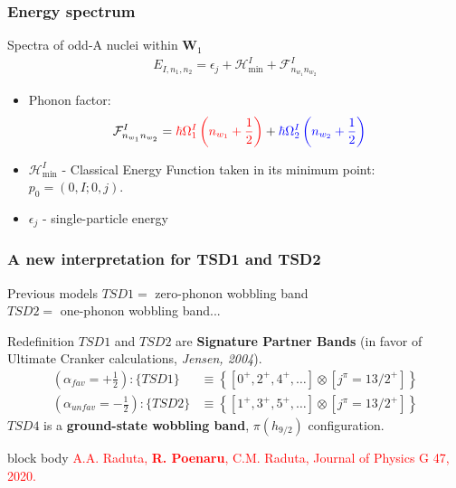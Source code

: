 \documentclass{beamer}
\begin{document}
\begin{frame}
	\frametitle{Energy spectrum}
	\begin{exampleblock}{Spectra of odd-A nuclei within $\mathbf{W}_1$}
		\begin{align}
			E_{I,n_1,n_2}=\epsilon_j+\mathcal{H}_\text{min}^I+\mathcal{F}_{n_{w_1}n_{w_2}}^I\nonumber
			\label{tsd-bands-general-spectrum}
		\end{align}
	\end{exampleblock}
	\begin{itemize}
		\item Phonon factor:
		\begin{align}
			\mathcal{F}_{n_{w_1}n_{w_2}}^I&={\color{red}\hbar\Omega_1^I\left(n_{w_1}+\frac{1}{2}\right)}+{\color{blue}\hbar\Omega_2^I\left(n_{w_2}+\frac{1}{2}\right)}\nonumber
		\end{align}
		\item $\mathcal{H}_\text{min}^I$ - Classical Energy Function taken in its minimum point: $p_0=(0,I;0,j)$.
		\item $\epsilon_j$ - single-particle energy
	\end{itemize}
\end{frame}

\begin{frame}
	\frametitle{A new interpretation for TSD1 and TSD2}
	\begin{exampleblock}{Previous models}
		$TSD1=$ zero-phonon wobbling band\\
		$TSD2=$ one-phonon wobbling band...
	\end{exampleblock}
	\begin{alertblock}{Redefinition}
		$TSD1$ and $TSD2$ are \textbf{Signature Partner Bands} (in favor of Ultimate Cranker calculations, \textit{Jensen, 2004}).
		\begin{align}
			\left(\alpha_{fav}=+\frac{1}{2}\right): \{TSD1\}&\equiv\left\{\left[0^+,2^+,4^+,\dots\right] \otimes [j^\pi=13/2^+]\right\}\nonumber\\
			\left(\alpha_{unfav}=-\frac{1}{2}\right): \{TSD2\}&\equiv\left\{\left[1^+,3^+,5^+,\dots\right] \otimes [j^\pi=13/2^+]\right\}\nonumber
		\end{align}
		$TSD4$ is a \textbf{ground-state wobbling band}, $\pi(h_{9/2})$ configuration.
	\end{alertblock}
	\begin{beamercolorbox}[rounded=true,shadow=false, wd=\linewidth,]{block body}
		\centering
		\textcolor{red}{\footnotesize{A.A. Raduta, \textbf{R. Poenaru}, C.M. Raduta, Journal of Physics G 47, 2020.}}
	\end{beamercolorbox}
\end{frame}
\end{document}
